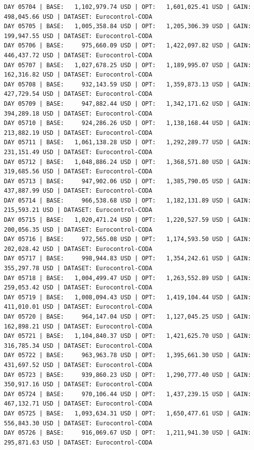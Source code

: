 \documentclass[11pt,a4paper]{article}
\begin{document}
\begin{verbatim}
DAY 05704 | BASE:   1,102,979.74 USD | OPT:   1,601,025.41 USD | GAIN: 498,045.66 USD | DATASET: Eurocontrol-CODA
DAY 05705 | BASE:   1,005,358.84 USD | OPT:   1,205,306.39 USD | GAIN: 199,947.55 USD | DATASET: Eurocontrol-CODA
DAY 05706 | BASE:     975,660.09 USD | OPT:   1,422,097.82 USD | GAIN: 446,437.72 USD | DATASET: Eurocontrol-CODA
DAY 05707 | BASE:   1,027,678.25 USD | OPT:   1,189,995.07 USD | GAIN: 162,316.82 USD | DATASET: Eurocontrol-CODA
DAY 05708 | BASE:     932,143.59 USD | OPT:   1,359,873.13 USD | GAIN: 427,729.54 USD | DATASET: Eurocontrol-CODA
DAY 05709 | BASE:     947,882.44 USD | OPT:   1,342,171.62 USD | GAIN: 394,289.18 USD | DATASET: Eurocontrol-CODA
DAY 05710 | BASE:     924,286.26 USD | OPT:   1,138,168.44 USD | GAIN: 213,882.19 USD | DATASET: Eurocontrol-CODA
DAY 05711 | BASE:   1,061,138.28 USD | OPT:   1,292,289.77 USD | GAIN: 231,151.49 USD | DATASET: Eurocontrol-CODA
DAY 05712 | BASE:   1,048,886.24 USD | OPT:   1,368,571.80 USD | GAIN: 319,685.56 USD | DATASET: Eurocontrol-CODA
DAY 05713 | BASE:     947,902.06 USD | OPT:   1,385,790.05 USD | GAIN: 437,887.99 USD | DATASET: Eurocontrol-CODA
DAY 05714 | BASE:     966,538.68 USD | OPT:   1,182,131.89 USD | GAIN: 215,593.21 USD | DATASET: Eurocontrol-CODA
DAY 05715 | BASE:   1,020,471.24 USD | OPT:   1,220,527.59 USD | GAIN: 200,056.35 USD | DATASET: Eurocontrol-CODA
DAY 05716 | BASE:     972,565.08 USD | OPT:   1,174,593.50 USD | GAIN: 202,028.42 USD | DATASET: Eurocontrol-CODA
DAY 05717 | BASE:     998,944.83 USD | OPT:   1,354,242.61 USD | GAIN: 355,297.78 USD | DATASET: Eurocontrol-CODA
DAY 05718 | BASE:   1,004,499.47 USD | OPT:   1,263,552.89 USD | GAIN: 259,053.42 USD | DATASET: Eurocontrol-CODA
DAY 05719 | BASE:   1,008,094.43 USD | OPT:   1,419,104.44 USD | GAIN: 411,010.01 USD | DATASET: Eurocontrol-CODA
DAY 05720 | BASE:     964,147.04 USD | OPT:   1,127,045.25 USD | GAIN: 162,898.21 USD | DATASET: Eurocontrol-CODA
DAY 05721 | BASE:   1,104,840.37 USD | OPT:   1,421,625.70 USD | GAIN: 316,785.34 USD | DATASET: Eurocontrol-CODA
DAY 05722 | BASE:     963,963.78 USD | OPT:   1,395,661.30 USD | GAIN: 431,697.52 USD | DATASET: Eurocontrol-CODA
DAY 05723 | BASE:     939,860.23 USD | OPT:   1,290,777.40 USD | GAIN: 350,917.16 USD | DATASET: Eurocontrol-CODA
DAY 05724 | BASE:     970,106.44 USD | OPT:   1,437,239.15 USD | GAIN: 467,132.71 USD | DATASET: Eurocontrol-CODA
DAY 05725 | BASE:   1,093,634.31 USD | OPT:   1,650,477.61 USD | GAIN: 556,843.30 USD | DATASET: Eurocontrol-CODA
DAY 05726 | BASE:     916,069.67 USD | OPT:   1,211,941.30 USD | GAIN: 295,871.63 USD | DATASET: Eurocontrol-CODA

\end{verbatim}
\end{document}
